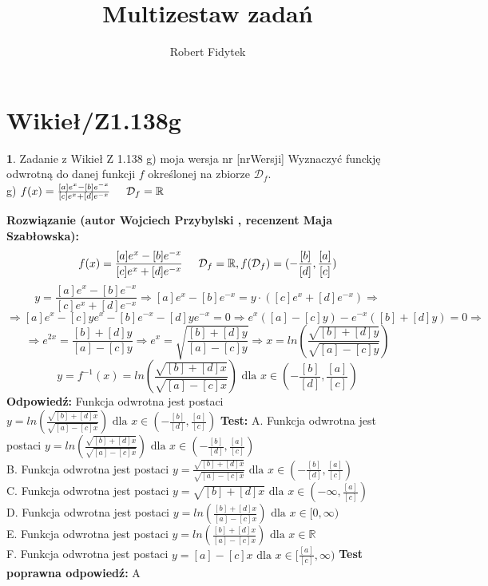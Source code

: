 \documentclass[12pt, a4paper]{article}
\title{Multizestaw zadań}
\author{Robert Fidytek}
\date{}
\theoremstyle{definition} %
\newtheorem{zad}{}
\newcommand{\kategoria}[1]{\section{#1}} %
\newcommand{\zadStart}[1]{\begin{zad}#1\newline} %
\newcommand{\zadStop}{\end{zad}}   %
\newcommand{\rozwStart}[2]{\noindent \textbf{Rozwiązanie (autor #1 , recenzent #2): }\newline} %
\newcommand{\rozwStop}{\newline}                                            %
\newcommand{\odpStart}{\noindent \textbf{Odpowiedź:}\newline}    %
\newcommand{\odpStop}{\newline}                                             %
\newcommand{\testStart}{\noindent \textbf{Test:}\newline} %
\newcommand{\testStop}{\newline} %
\newcommand{\kluczStart}{\noindent \textbf{Test poprawna odpowiedź:}\newline} %
\newcommand{\kluczStop}{\newline} %
\begin{document}
\maketitle


\kategoria{Wikieł/Z1.138g}
\zadStart{Zadanie z Wikieł Z 1.138 g) moja wersja nr [nrWersji]}
Wyznaczyć funckję odwrotną do danej funkcji $f$ określonej na zbiorze $\mathcal{D}_{f}$.\\
g) $f(x)=\frac{[a]e^{x}-[b]e^{-x}}{[c]e^{x}+[d]e^{-x}}\hspace{5mm}\mathcal{D}_{f}=\mathbb{R}$
\zadStop
\rozwStart{Wojciech Przybylski}{Maja Szabłowska}
$$f(x)=\frac{[a]e^{x}-[b]e^{-x}}{[c]e^{x}+[d]e^{-x}}\hspace{5mm} \mathcal{D}_{f}=\mathbb{R}, f(\mathcal{D}_{f})=(-\frac{[b]}{[d]},\frac{[a]}{[c]})$$
$$y=\frac{[a]e^{x}-[b]e^{-x}}{[c]e^{x}+[d]e^{-x}}\Rightarrow [a]e^{x}-[b]e^{-x}=y\cdot([c]e^{x}+[d]e^{-x}) \Rightarrow $$
$$\Rightarrow [a]e^{x}-[c]ye^{x}-[b]e^{-x}-[d]ye^{-x}=0 \Rightarrow e^{x}([a]-[c]y)-e^{-x}([b]+[d]y)=0 \Rightarrow$$
$$\Rightarrow e^{2x}=\frac{[b]+[d]y}{[a]-[c]y} \Rightarrow e^{x}=\sqrt{\frac{[b]+[d]y}{[a]-[c]y}} \Rightarrow x=ln(\frac{\sqrt{[b]+[d]y}}{\sqrt{[a]-[c]y}})$$
$$y=f^{-1}(x)=ln(\frac{\sqrt{[b]+[d]x}}{\sqrt{[a]-[c]x}}) \mbox{ dla } x\in (-\frac{[b]}{[d]},\frac{[a]}{[c]})$$
\rozwStop
\odpStart
Funkcja odwrotna jest postaci $y=ln(\frac{\sqrt{[b]+[d]x}}{\sqrt{[a]-[c]x}})  \mbox{ dla }x\in (-\frac{[b]}{[d]},\frac{[a]}{[c]})$
\odpStop
\testStart
A. Funkcja odwrotna jest postaci $y=ln(\frac{\sqrt{[b]+[d]x}}{\sqrt{[a]-[c]x}})   \mbox{ dla }x\in(-\frac{[b]}{[d]},\frac{[a]}{[c]})$\\
B. Funkcja odwrotna jest postaci $y=\frac{\sqrt{[b]+[d]x}}{\sqrt{[a]-[c]x}}  \mbox{ dla }x\in(-\frac{[b]}{[d]},\frac{[a]}{[c]})$\\
C. Funkcja odwrotna jest postaci $y=\sqrt{[b]+[d]x} \mbox{ dla }x\in(-\infty,\frac{[a]}{[c]})$\\
D. Funkcja odwrotna jest postaci $y=ln(\frac{[b]+[d]x}{[a]-[c]x})  \mbox{ dla }x\in[0,\infty)$\\
E. Funkcja odwrotna jest postaci $y=ln(\frac{[b]+[d]x}{[a]-[c]x})  \mbox{ dla }x\in \mathbb{R}$\\
F. Funkcja odwrotna jest postaci $y=[a]-[c]x\mbox{ dla }x\in[\frac{[a]}{[c]},\infty)$
\testStop
\kluczStart
A
\kluczStop
\end{document}
